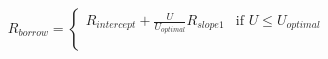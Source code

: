 \documentclass[preview]{standalone}
\begin{document}
\begin{align*}
{R_{borrow} = \begin{cases} R_{intercept} + \frac{U}{U_{optimal}}R_{slope1} & \text{if } U \leq U_{optimal} \\ \text{} \\ \text{} \end{cases}}
\end{align*}
\end{document}
